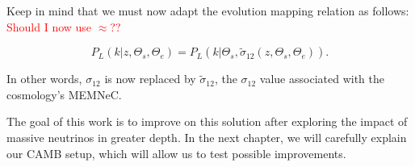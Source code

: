 
Keep in mind that we must now adapt the evolution mapping relation as follows:
\textcolor{red}{Should I now use $\approx$??}

\begin{equation}
\label{eq: evMapping_modded}
    P_L (k | z, \Theta_s, \Theta_e)
    =
    P_L (k | \Theta_s,
    		\tilde{\sigma}_{12} \left( z, \Theta_s, \Theta_e \right))
.\end{equation}

In other words, $\sigma_{12}$ is now replaced by $\tilde{\sigma}_{12}$, the
$\sigma_{12}$ value associated with the cosmology's MEMNeC.

The goal of this work is to improve on this solution after exploring the 
impact 
of massive neutrinos in greater depth. In the next chapter, we will carefully 
explain our CAMB setup, which will allow us to test possible improvements.